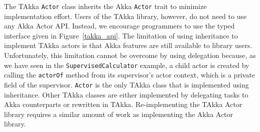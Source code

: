 The TAkka {\tt Actor} class inherits 
the Akka {\tt Actor} trait to minimize implementation effort.  Users of the 
TAkka library, however, do not need to use any Akka Actor API.  Instead, we 
encourage programmers to use the typed interface given in Figure~\ref{takka_api}.  
The limitation of using inheritance to implement TAkka actors 
is that Akka features are still available to library users.  Unfortunately, 
this limitation cannot be overcome by using delegation because, as we have seen 
in the {\tt SupervisedCalculator} example, a child actor is created by calling the {\tt actorOf} method from 
its supervisor's actor context, which is a private field of the supervisor.  
{\tt Actor} is the only TAkka class that is implemented using inheritance. 
Other TAkka classes are either implemented by delegating tasks to Akka 
counterparts or rewritten in TAkka.  Re-implementing the TAkka 
Actor library requires a similar amount of work as implementing the Akka Actor 
library.


